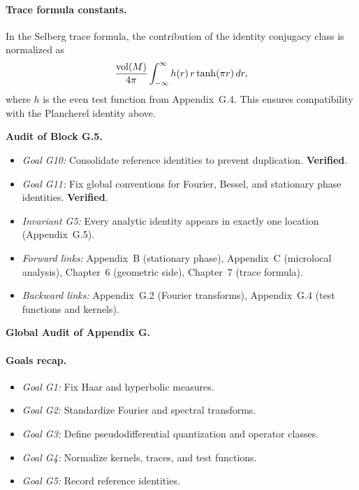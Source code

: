 \paragraph{Trace formula constants.}  
In the Selberg trace formula, the contribution of the identity conjugacy class is normalized as
\[
\frac{\operatorname{vol}(M)}{4\pi} \int_{-\infty}^\infty h(r)\, r \tanh(\pi r)\, dr,
\]
where $h$ is the even test function from Appendix~G.4.  
This ensures compatibility with the Plancherel identity above.

\bigskip
\noindent\textbf{Audit of Block G.5.}
\begin{itemize}
  \item \emph{Goal G10:} Consolidate reference identities to prevent duplication. \textbf{Verified}.
  \item \emph{Goal G11:} Fix global conventions for Fourier, Bessel, and stationary phase identities. \textbf{Verified}.
  \item \emph{Invariant G5:} Every analytic identity appears in exactly one location (Appendix~G.5).  
  \item \emph{Forward links:} Appendix~B (stationary phase), Appendix~C (microlocal analysis), Chapter~6 (geometric side), Chapter~7 (trace formula).  
  \item \emph{Backward links:} Appendix~G.2 (Fourier transforms), Appendix~G.4 (test functions and kernels).  
\end{itemize}

\bigskip
\noindent\textbf{Global Audit of Appendix G.}

\paragraph{Goals recap.}
\begin{itemize}
  \item \emph{Goal G1:} Fix Haar and hyperbolic measures.  
  \item \emph{Goal G2:} Standardize Fourier and spectral transforms.  
  \item \emph{Goal G3:} Define pseudodifferential quantization and operator classes.  
  \item \emph{Goal G4:} Normalize kernels, traces, and test functions.  
  \item \emph{Goal G5:} Record reference identities.  
\end{itemize}

